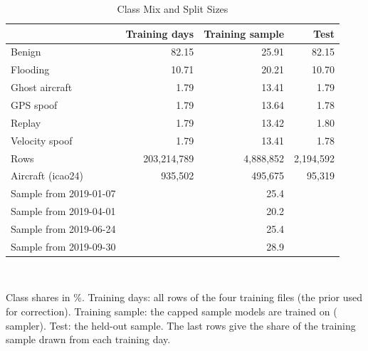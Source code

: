 \begin{table}[t]
\centering
\footnotesize
\caption{Class Mix and Split Sizes}
\label{tab:mix}
\setlength{\tabcolsep}{4pt}
\begin{tabular}{lrrr}
\toprule
& Training days & Training sample & Test \\
\midrule
Benign & 82.15 & 25.91 & 82.15 \\
Flooding & 10.71 & 20.21 & 10.70 \\
Ghost aircraft & 1.79 & 13.41 & 1.79 \\
GPS spoof & 1.79 & 13.64 & 1.78 \\
Replay & 1.79 & 13.42 & 1.80 \\
Velocity spoof & 1.79 & 13.41 & 1.78 \\
\midrule
Rows & 203{,}214{,}789 & 4{,}888{,}852 & 2{,}194{,}592 \\
Aircraft (icao24) & 935{,}502 & 495{,}675 & 95{,}319 \\
\midrule
Sample from 2019-01-07 & & 25.4 & \\
Sample from 2019-04-01 & & 20.2 & \\
Sample from 2019-06-24 & & 25.4 & \\
Sample from 2019-09-30 & & 28.9 & \\
\bottomrule
\end{tabular}
\\[2pt]
\parbox{\linewidth}{\scriptsize Class shares in \%. Training days: all rows of the four training files (the prior used for correction). Training sample: the capped sample models are trained on ( sampler). Test: the held-out sample. The last rows give the share of the training sample drawn from each training day.}
\end{table}
